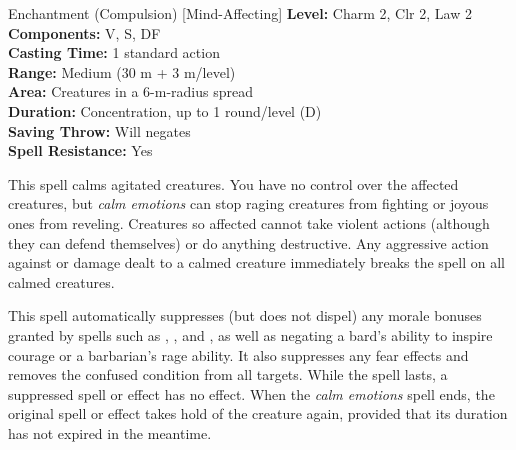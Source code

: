 {Enchantment (Compulsion) [Mind-Affecting]}
{
	\textbf{Level:}
	Charm 2, Clr 2, Law 2\\
	\textbf{Components:}
	V, S, DF\\
	\textbf{Casting Time:}
	1 standard action\\
	\textbf{Range:}
	Medium (30 m + 3 m/level)\\
	\textbf{Area:}
	Creatures in a 6-m-radius spread\\
	\textbf{Duration:}
	Concentration, up to 1 round/level (D)\\
	\textbf{Saving Throw:}
	Will negates\\
	\textbf{Spell Resistance:}
	Yes\\
}
{
	This spell calms agitated creatures. You have no control over the affected creatures, but \emph{calm emotions} can stop raging creatures from fighting or joyous ones from reveling. Creatures so affected cannot take violent actions (although they can defend themselves) or do anything destructive. Any aggressive action against or damage dealt to a calmed creature immediately breaks the spell on all calmed creatures.

	This spell automatically suppresses (but does not dispel) any morale bonuses granted by spells such as , , and , as well as negating a bard's ability to inspire courage or a barbarian's rage ability. It also suppresses any fear effects and removes the confused condition from all targets. While the spell lasts, a suppressed spell or effect has no effect. When the \emph{calm emotions} spell ends, the original spell or effect takes hold of the creature again, provided that its duration has not expired in the meantime.

}

